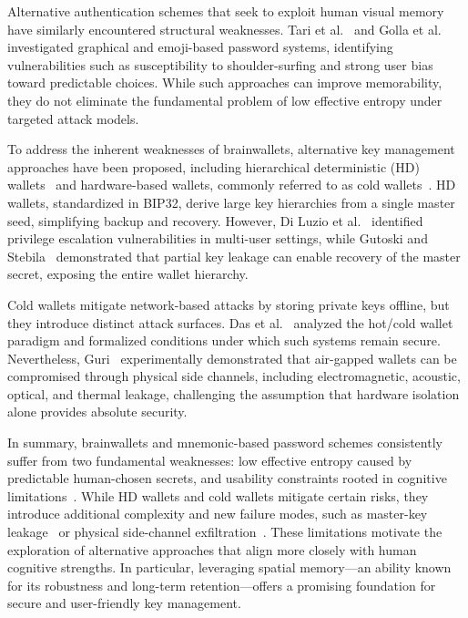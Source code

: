 \documentclass[journal,article,accept,pdftex,moreauthors]{Definitions/mdpi}
\begin{document}
Alternative authentication schemes that seek to exploit human visual memory have similarly encountered structural weaknesses. Tari et al.~\cite{Tari2006} and Golla et al.~\cite{Golla2017} investigated graphical and emoji-based password systems, identifying vulnerabilities such as susceptibility to shoulder-surfing and strong user bias toward predictable choices. While such approaches can improve memorability, they do not eliminate the fundamental problem of low effective entropy under targeted attack models.

To address the inherent weaknesses of brainwallets, alternative key management approaches have been proposed, including hierarchical deterministic (HD) wallets~\cite{DiLuzio2020, Gutoski2015} and hardware-based wallets, commonly referred to as cold wallets~\cite{Das2019,8726762}. HD wallets, standardized in BIP32, derive large key hierarchies from a single master seed, simplifying backup and recovery. However, Di Luzio et al.~\cite{DiLuzio2020} identified privilege escalation vulnerabilities in multi-user settings, while Gutoski and Stebila~\cite{Gutoski2015} demonstrated that partial key leakage can enable recovery of the master secret, exposing the entire wallet hierarchy.

Cold wallets mitigate network-based attacks by storing private keys offline, but they introduce distinct attack surfaces. Das et al.~\cite{Das2019} analyzed the hot/cold wallet paradigm and formalized conditions under which such systems remain secure. Nevertheless, Guri~\cite{8726762} experimentally demonstrated that air-gapped wallets can be compromised through physical side channels, including electromagnetic, acoustic, optical, and thermal leakage, challenging the assumption that hardware isolation alone provides absolute security.

In summary, brainwallets and mnemonic-based password schemes consistently suffer from two fundamental weaknesses: low effective entropy caused by predictable human-chosen secrets, and usability constraints rooted in cognitive limitations~\cite{Kuo2006, Vasek2017, Yang2016}. While HD wallets and cold wallets mitigate certain risks, they introduce additional complexity and new failure modes, such as master-key leakage~\cite{Gutoski2015, DiLuzio2020} or physical side-channel exfiltration~\cite{Das2019,8726762}. These limitations motivate the exploration of alternative approaches that align more closely with human cognitive strengths. In particular, leveraging spatial memory—an ability known for its robustness and long-term retention—offers a promising foundation for secure and user-friendly key management.
\end{document}
